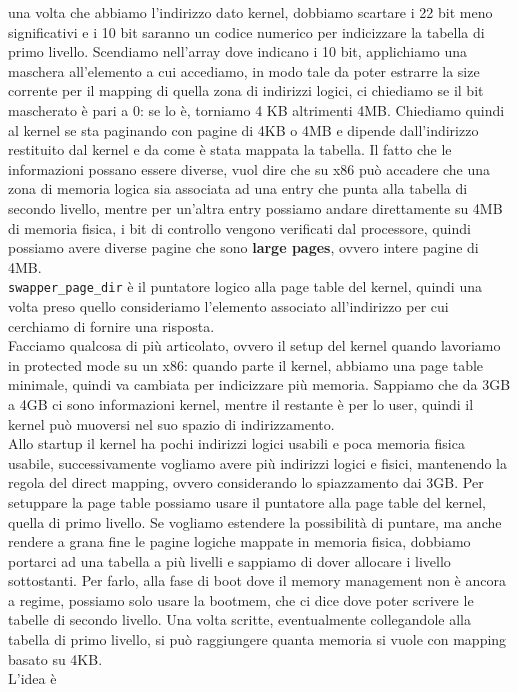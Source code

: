 \documentclass[12pt, oneside]{extbook}
\begin{document}
una volta che abbiamo l'indirizzo dato kernel, dobbiamo scartare i 22 bit meno significativi e i 10 bit saranno un codice numerico per indicizzare la tabella di primo livello. Scendiamo nell'array dove indicano i 10 bit, applichiamo una maschera all'elemento a cui accediamo, in modo tale da poter estrarre la size corrente per il mapping di quella zona di indirizzi logici, ci chiediamo se il bit mascherato è pari a 0: se lo è, torniamo 4 KB altrimenti 4MB. Chiediamo quindi al kernel se sta paginando con pagine di 4KB o 4MB e dipende dall'indirizzo restituito dal kernel e da come è stata mappata la tabella. Il fatto che le informazioni possano essere diverse, vuol dire che su x86 può accadere che una zona di memoria logica sia associata ad una entry che punta alla tabella di secondo livello, mentre per un'altra entry possiamo andare direttamente su 4MB di memoria fisica, i bit di controllo vengono verificati dal processore, quindi possiamo avere diverse pagine che sono \textbf{large pages}, ovvero intere pagine di 4MB.\\ \texttt{swapper\_page\_dir} è il puntatore logico alla page table del kernel, quindi una volta preso quello consideriamo l'elemento associato all'indirizzo per cui cerchiamo di fornire una risposta.\\ Facciamo qualcosa di più articolato, ovvero il setup del kernel quando lavoriamo in protected mode su un x86: quando parte il kernel, abbiamo una page table minimale, quindi va cambiata per indicizzare più memoria. Sappiamo che da 3GB a 4GB ci sono informazioni kernel, mentre il restante è per lo user, quindi il kernel può muoversi nel suo spazio di indirizzamento.\\Allo startup il kernel ha pochi indirizzi logici usabili e poca memoria fisica usabile, successivamente vogliamo avere più indirizzi logici e fisici, mantenendo la regola del direct mapping, ovvero considerando lo spiazzamento dai 3GB. Per setuppare la page table possiamo usare il puntatore alla page table del kernel, quella di primo livello. Se vogliamo estendere la possibilità di puntare, ma anche rendere a grana fine le pagine logiche mappate in memoria fisica, dobbiamo portarci ad una tabella a più livelli e sappiamo di dover allocare i livello sottostanti. Per farlo, alla fase di boot dove il memory management non è ancora a regime, possiamo solo usare la bootmem, che ci dice dove poter scrivere le tabelle di secondo livello. Una volta scritte, eventualmente collegandole alla tabella di primo livello, si può raggiungere quanta memoria si vuole con mapping basato su 4KB.\\ L'idea è
\end{document}
